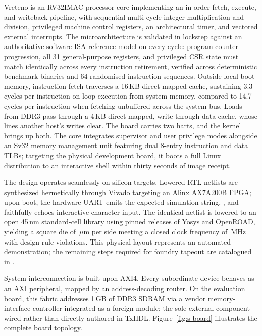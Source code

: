 \documentclass[journal,9pt]{IEEEtran}
\begin{document}
Vreteno is an RV32IMAC processor core implementing an in-order fetch, execute,
and writeback pipeline, with sequential multi-cycle integer multiplication and
division, privileged machine control registers, an architectural timer, and
vectored external interrupts. The microarchitecture is validated in lockstep
against an authoritative software ISA reference model on every cycle: program
counter progression, all 31 general-purpose registers, and privileged CSR
state must match identically across every instruction retirement, verified
across deterministic benchmark binaries and 64 randomised instruction
sequences. Outside local boot memory, instruction fetch traverses a 16\,KB
direct-mapped cache, sustaining 3.3 cycles per instruction on loop execution
from system memory, compared to 14.7 cycles per instruction when fetching
unbuffered across the system bus. Loads from DDR3 pass through a 4\,KB
direct-mapped, write-through data cache, whose lines another host's writes
clear. The board carries two harts, and the kernel brings up both. The
core integrates supervisor and user privilege modes alongside an Sv32
memory management unit featuring dual 8-entry
instruction and data TLBs; targeting the physical development board, it boots a
full Linux distribution to an interactive shell within thirty seconds of image
receipt.

The design operates seamlessly on silicon targets. Lowered RTL netlists are
synthesized hermetically through Vivado targeting an Alinx AX7A200B FPGA; upon
boot, the hardware UART emits the expected simulation string, , and
faithfully echoes interactive character input. The identical netlist is
lowered to an open 45\,nm standard-cell library using pinned releases of Yosys
and OpenROAD, yielding a square die of \asicdie\,$\mu$m per side meeting a
closed clock frequency of \asicfreq\,MHz with \asicdrc{} design-rule
violations. This physical layout represents an automated demonstration; the
remaining steps required for foundry tapeout are catalogued in
.

System interconnection is built upon AXI4. Every subordinate device behaves as
an AXI peripheral, mapped by an address-decoding router. On the evaluation
board, this fabric addresses 1\,GB of DDR3 SDRAM via a vendor memory-interface
controller integrated as a foreign module: the sole external component wired
rather than directly authored in TxHDL. Figure~\ref{fig:s-board} illustrates
the complete board topology.
\end{document}
